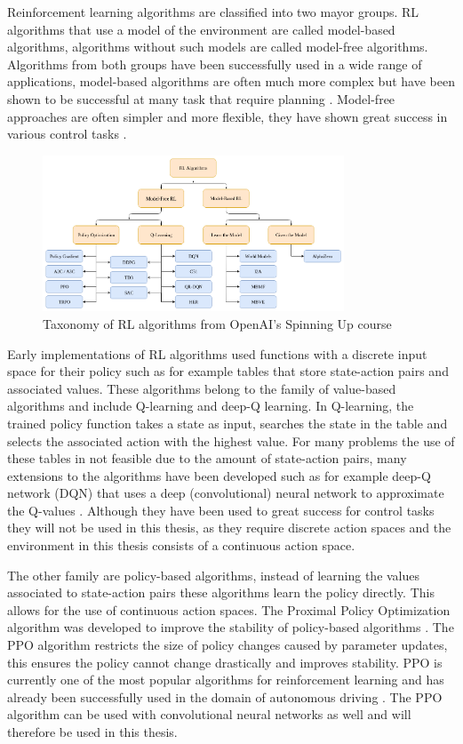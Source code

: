 Reinforcement learning algorithms are classified into two mayor groups. RL algorithms that use a model of the environment are called model-based algorithms, algorithms without such models are called model-free algorithms. Algorithms from both groups have been successfully used in a wide range of applications, model-based algorithms are often much more complex but have been shown to be successful at many task that require planning \autocite{alphagoimprovementmuzero}. Model-free approaches are often simpler and more flexible, they have shown great success in various control tasks \autocite{atari}.

\begin{figure}
    \centering
    \includegraphics[width=0.8\textwidth]{Bilder/openai_spinningup_taxonomy.png}
    \caption{Taxonomy of RL algorithms from OpenAI's Spinning Up course \autocite{spinningup}}
\end{figure}

Early implementations of RL algorithms used functions with a discrete input space for their policy such as for example tables that store state-action pairs and associated values. These algorithms belong to the family of value-based algorithms and include Q-learning and deep-Q learning. In Q-learning, the trained policy function takes a state as input, searches the state in the table and selects the associated action with the highest value. For many problems the use of these tables in not feasible due to the amount of state-action pairs, many extensions to the algorithms have been developed such as for example deep-Q network (DQN) that uses a deep (convolutional) neural network to approximate the Q-values \autocite{atari}.
Although they have been used to great success for control tasks they will not be used in this thesis, as they require discrete action spaces and the environment in this thesis consists of a continuous action space.


The other family are policy-based algorithms, instead of learning the values associated to state-action pairs these algorithms learn the policy directly. This allows for the use of continuous action spaces. The Proximal Policy Optimization algorithm was developed to improve the stability of policy-based algorithms \autocite{ppo}. The PPO algorithm restricts the size of policy changes caused by parameter updates, this ensures the policy cannot change drastically and improves stability. PPO is currently one of the most popular algorithms for reinforcement learning and has already been successfully used in the domain of autonomous driving \autocite{maximilian}. The PPO algorithm can be used with convolutional neural networks as well and will therefore be used in this thesis.


